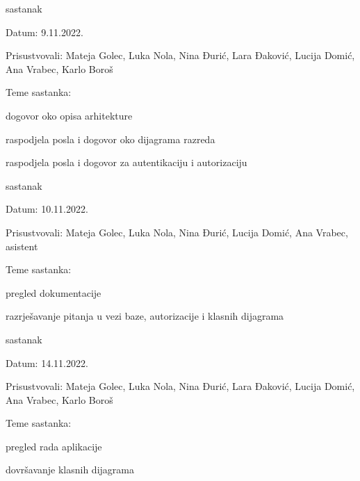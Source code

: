 \begin{packed_enum}
			\item  sastanak
			\item[] \begin{packed_item}
				\item Datum: 9.11.2022.
				\item Prisustvovali: Mateja Golec, Luka Nola, Nina Đurić, Lara Đaković, Lucija Domić, Ana Vrabec, Karlo Boroš
				\item Teme sastanka:
				\begin{packed_item}
					\item  dogovor oko opisa arhitekture
					\item  raspodjela posla i dogovor oko dijagrama razreda
					\item  raspodjela posla i dogovor za autentikaciju i autorizaciju
				\end{packed_item}
			\end{packed_item}

			\item  sastanak
			\item[] \begin{packed_item}
				\item Datum: 10.11.2022.
				\item Prisustvovali: Mateja Golec, Luka Nola, Nina Đurić, Lucija Domić, Ana Vrabec, asistent
				\item Teme sastanka:
				\begin{packed_item}
					\item  pregled dokumentacije
					\item  razrješavanje pitanja u vezi baze,  autorizacije i klasnih dijagrama
				\end{packed_item}
			\end{packed_item}

			\item  sastanak
			\item[] \begin{packed_item}
				\item Datum: 14.11.2022.
				\item Prisustvovali: Mateja Golec, Luka Nola, Nina Đurić, Lara Đaković, Lucija Domić, Ana Vrabec, Karlo Boroš
				\item Teme sastanka:
				\begin{packed_item}
					\item  pregled rada aplikacije
					\item  dovršavanje klasnih dijagrama
				\end{packed_item}
			\end{packed_item}
		

\end{packed_enum}
